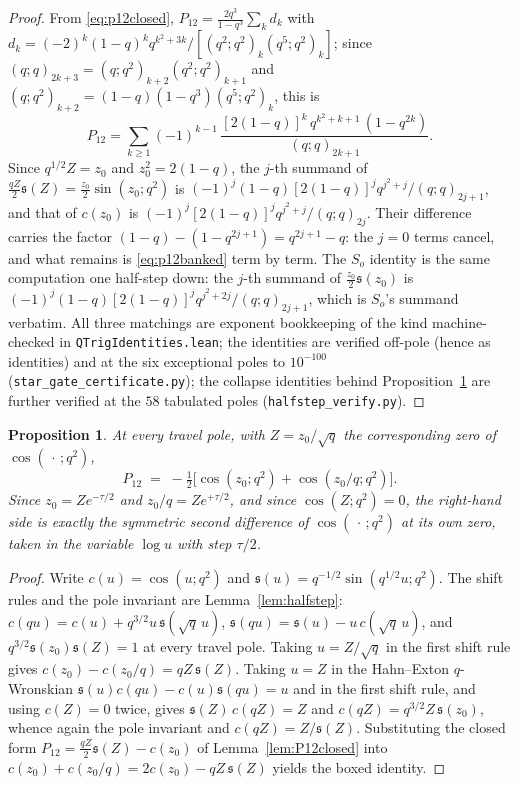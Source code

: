 \documentclass[11pt]{article}
\theoremstyle{plain}
\newtheorem{proposition}[theorem]{Proposition}
\theoremstyle{definition}
\theoremstyle{remark}
\begin{document}
\begin{proof}
From \eqref{eq:p12closed}, $P_{12}=\tfrac{2q^3}{1-q^3}\sum_kd_k$ with
$d_k=(-2)^k(1-q)^kq^{k^2+3k}/[(q^2;q^2)_k(q^5;q^2)_k]$; since
$(q;q)_{2k+3}=(q;q^2)_{k+2}(q^2;q^2)_{k+1}$ and $(q;q^2)_{k+2}=(1-q)(1-q^3)(q^5;q^2)_k$, this is
\begin{equation}\label{eq:p12banked}
 P_{12}=\sum_{k\ge1}(-1)^{k-1}\,\frac{[2(1-q)]^k\,q^{k^2+k+1}\,(1-q^{2k})}{(q;q)_{2k+1}} .
\end{equation}
Since $q^{1/2}Z=z_0$ and $z_0^2=2(1-q)$, the $j$-th summand of
$\tfrac{qZ}2\mathfrak s(Z)=\tfrac{z_0}2\sin(z_0;q^2)$ is
$(-1)^j(1-q)[2(1-q)]^jq^{j^2+j}/(q;q)_{2j+1}$, and that of $c(z_0)$ is
$(-1)^j[2(1-q)]^jq^{j^2+j}/(q;q)_{2j}$. Their difference carries the factor
$(1-q)-(1-q^{2j+1})=q^{2j+1}-q$: the $j=0$ terms cancel, and what remains is
\eqref{eq:p12banked} term by term. The $S_o$ identity is the same computation one half-step down:
the $j$-th summand of $\tfrac{z_0}2\mathfrak s(z_0)$ is
$(-1)^j(1-q)[2(1-q)]^jq^{j^2+2j}/(q;q)_{2j+1}$, which is $S_o$'s summand verbatim. All three
matchings are exponent bookkeeping of the kind machine-checked in \texttt{QTrigIdentities.lean};
the identities are verified off-pole (hence as identities) and at the six exceptional poles to
$10^{-100}$ (\texttt{star\_gate\_certificate.py}); the collapse identities behind
Proposition~\ref{prop:P12second} are further verified at the $58$ tabulated poles
(\texttt{halfstep\_verify.py}).
\end{proof}

\begin{proposition}\label{prop:P12second}
At every travel pole, with $Z=z_0/\sqrt q$ the corresponding zero of $\cos(\,\cdot\,;q^2)$,
\[
 \boxed{\;P_{12}\;=\;-\tfrac12\bigl[\cos(z_0;q^2)+\cos(z_0/q;q^2)\bigr].\;}
\]
Since $z_0=Ze^{-\tau/2}$ and $z_0/q=Ze^{+\tau/2}$, and since $\cos(Z;q^2)=0$, the right-hand side is
exactly the symmetric second difference of $\cos(\,\cdot\,;q^2)$ at its own zero, taken in the
variable $\log u$ with step $\tau/2$.
\end{proposition}

\begin{proof}
Write $c(u)=\cos(u;q^2)$ and $\mathfrak s(u)=q^{-1/2}\sin(q^{1/2}u;q^2)$. The shift rules and the
pole invariant are Lemma~\ref{lem:halfstep}:
$c(qu)=c(u)+q^{3/2}u\,\mathfrak s(\sqrt q\,u)$, $\mathfrak s(qu)=\mathfrak s(u)-u\,c(\sqrt q\,u)$,
and $q^{3/2}\mathfrak s(z_0)\mathfrak s(Z)=1$ at every travel pole.
Taking $u=Z/\sqrt q$ in the first shift rule gives $c(z_0)-c(z_0/q)=qZ\,\mathfrak s(Z)$. Taking
$u=Z$ in the Hahn--Exton $q$-Wronskian $\mathfrak s(u)c(qu)-c(u)\mathfrak s(qu)=u$ and in the first
shift rule, and using $c(Z)=0$ twice, gives
$\mathfrak s(Z)\,c(qZ)=Z$ and $c(qZ)=q^{3/2}Z\,\mathfrak s(z_0)$, whence again the pole invariant
and $c(qZ)=Z/\mathfrak s(Z)$. Substituting the closed
form $P_{12}=\tfrac{qZ}2\mathfrak s(Z)-c(z_0)$ of Lemma~\ref{lem:P12closed} into
$c(z_0)+c(z_0/q)=2c(z_0)-qZ\,\mathfrak s(Z)$ yields the boxed identity.
\end{proof}
\end{document}
